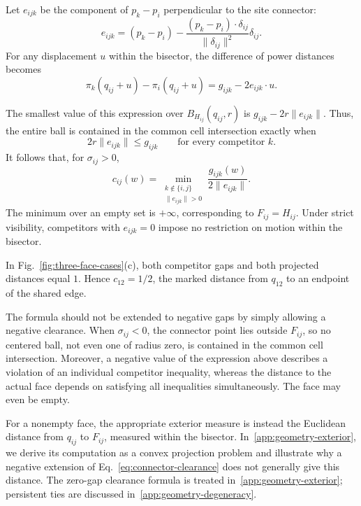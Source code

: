 Let $e_{ijk}$ be the component of $p_k-p_i$ perpendicular to the site connector:
\begin{equation}
e_{ijk}
=(p_k-p_i)
-\frac{(p_k-p_i)\cdot\delta_{ij}}
{\|\delta_{ij}\|^2}\delta_{ij}.
\label{eq:projected-competitor}
\end{equation}
For any displacement $u$ within the bisector, the difference of power distances becomes
\begin{equation}
\pi_k(q_{ij}+u)-\pi_i(q_{ij}+u)
=g_{ijk}-2e_{ijk}\cdot u.
\label{eq:power-gap-displacement}
\end{equation}

The smallest value of this expression over $B_{H_{ij}}(q_{ij},r)$ is $g_{ijk}-2r\|e_{ijk}\|$. Thus, the entire ball is contained in the common cell intersection exactly when
\begin{equation}
2r\|e_{ijk}\|\le g_{ijk}
\qquad\text{for every competitor }k.
\label{eq:clearance-inequalities}
\end{equation}
It follows that, for $\sigma_{ij}>0$,
\begin{equation}
\boxed{
c_{ij}(w)=
\min_{\substack{k\notin\{i,j\}\\\|e_{ijk}\|>0}}
\frac{g_{ijk}(w)}{2\|e_{ijk}\|}.
}
\label{eq:connector-clearance}
\end{equation}
The minimum over an empty set is $+\infty$, corresponding to $F_{ij}=H_{ij}$. Under strict visibility, competitors with $e_{ijk}=0$ impose no restriction on motion within the bisector.

In Fig.~\ref{fig:three-face-cases}(c), both competitor gaps and both projected distances equal $1$. Hence $c_{12}=1/2$, the marked distance from $q_{12}$ to an endpoint of the shared edge.

The formula should not be extended to negative gaps by simply allowing a negative clearance. When $\sigma_{ij}<0$, the connector point lies outside $F_{ij}$, so no centered ball, not even one of radius zero, is contained in the common cell intersection. Moreover, a negative value of the expression above describes a violation of an individual competitor inequality, whereas the distance to the actual face depends on satisfying all inequalities simultaneously. The face may even be empty.

For a nonempty face, the appropriate exterior measure is instead the Euclidean distance from $q_{ij}$ to $F_{ij}$, measured within the bisector. In~\ref{app:geometry-exterior}, we derive its computation as a convex projection problem and illustrate why a negative extension of Eq.~\eqref{eq:connector-clearance} does not generally give this distance. The zero-gap clearance formula is treated in~\ref{app:geometry-exterior}; persistent ties are discussed in~\ref{app:geometry-degeneracy}. 

